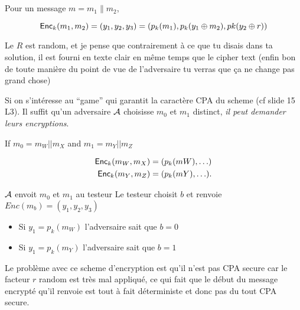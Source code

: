 \subsection{}
\begin{solution}
  Pour un message $m = m_1 \| m_2$,

  \[ \operatorname{\mathsf{Enc}}_k(m_1, m_2) = (y_1, y_2, y_3)  =(p_k(m_1) , p_k(y_1 \oplus m_2), pk(y_2 \oplus r)) \]

  Le $R$ est random, et je pense que contrairement à ce que tu disais dans ta
  solution, il est fourni en texte clair en même temps que le cipher text
  (enfin bon de toute manière du point de vue de l'adversaire tu verras que
  ça ne change pas grand chose)

  Si on s'intéresse au ``game'' qui garantit la caractère CPA du scheme (cf slide 15 L3).
  Il suffit qu'un adversaire $\mathcal{A}$ choisisse $m_0$ et $m_1$ distinct, \emph{il peut demander
  leurs encryptions}.

  If $m_0 = m_W || m_X$ and $m_1 = m_Y || m_Z$

  \begin{align*}
    \operatorname{\mathsf{Enc}}_k(m_W,m_X) = (p_k(mW), \ldots)\\
    \operatorname{\mathsf{Enc}}_k(m_Y,m_Z) = (p_k(mY), \ldots).
  \end{align*}

  $\mathcal{A}$ envoit $m_0$ et $m_1$ au testeur
  Le testeur choisit $b$ et renvoie $Enc(m_b) = (y_1 ,y_2, y_3)$

  \begin{itemize}
    \item Si $y_1 = p_k(m_W)$ l'adversaire sait que $b = 0$
    \item Si $y_1 = p_k(m_Y)$ l'adversaire sait que $b = 1$
  \end{itemize}

  Le problème avec ce scheme d'encryption est qu'il n'est pas CPA secure car
  le facteur $r$ random est très mal appliqué, ce qui fait que le début du
  message encrypté qu'il renvoie est tout à fait déterministe et donc pas du
  tout CPA secure.
\end{solution}

